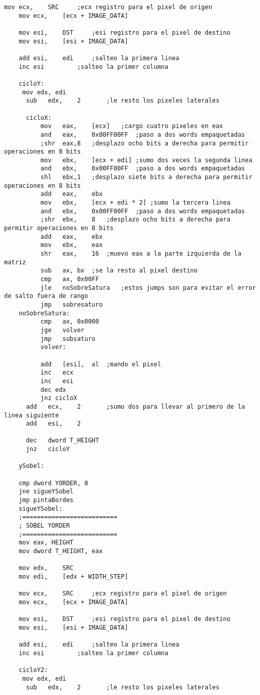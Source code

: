 \documentclass[11pt]{article}
\begin{document}
\begin{lstlisting}[frame=single]
	mov	ecx,	SRC		;ecx registro para el pixel de origen
	mov	ecx,	[ecx + IMAGE_DATA]

	mov	esi,	DST		;esi registro para el pixel de destino
	mov	esi,	[esi + IMAGE_DATA]

	add	esi,	edi		;salteo la primera linea
	inc	esi			;salteo la primer columna

	cicloY:
	 mov edx, edi
	  sub	edx,	2		;le resto los pixeles laterales
	  
	  cicloX:
	      mov	eax,	[ecx]	;cargo cuatro pixeles en eax
	      and	eax,	0x00FF00FF	;paso a dos words empaquetadas
	      ;shr	eax,8	;desplazo ocho bits a derecha para permitir operaciones en 8 bits
	      mov	ebx,	[ecx + edi]	;sumo dos veces la segunda linea
	      and	ebx,	0x00FF00FF	;paso a dos words empaquetadas
	      shl	ebx,1	;desplazo siete bits a derecha para permitir operaciones en 8 bits
	      add	eax,	ebx
	      mov	ebx,	[ecx + edi * 2]	;sumo la tercera linea
	      and	ebx,	0x00FF00FF	;paso a dos words empaquetadas
	      ;shr	ebx,	8	;desplazo ocho bits a derecha para permitir operaciones en 8 bits
	      add	eax,	ebx
	      mov	ebx,	eax
	      shr	eax,	16	;muevo eax a la parte izquierda de la matriz
	      sub	ax,	bx	;se la resto al pixel destino
	      cmp	ax,	0x00FF
	      jle	noSobreSatura	;estos jumps son para evitar el error de salto fuera de rango
	      jmp	sobresaturo
	noSobreSatura:
	      cmp	ax,	0x0000
	      jge	volver
	      jmp	subsaturo
	      volver:

	      add	[esi],	al	;mando el pixel
	      inc	ecx
	      inc	esi
	      dec edx
	      jnz cicloX
	  add	ecx,	2		;sumo dos para llevar al primero de la linea siguiente
	  add	esi,	2

	  dec	dword T_HEIGHT
	  jnz	cicloY

	ySobel:

	cmp dword YORDER, 0
	jne	sigueYSobel
	jmp	pintaBordes
	sigueYSobel:
	;==========================
	; SOBEL YORDER
	;==========================
	mov eax, HEIGHT
	mov dword T_HEIGHT, eax

	mov	edx,	SRC
	mov	edi,	[edx + WIDTH_STEP]
	
	mov	ecx,	SRC		;ecx registro para el pixel de origen
	mov	ecx,	[ecx + IMAGE_DATA]

	mov	esi,	DST		;esi registro para el pixel de destino
	mov	esi,	[esi + IMAGE_DATA]

	add	esi,	edi		;salteo la primera linea
	inc	esi			;salteo la primer columna

	cicloY2:
	 mov edx, edi
	  sub	edx,	2		;le resto los pixeles laterales


\end{lstlisting}
\end{document}
